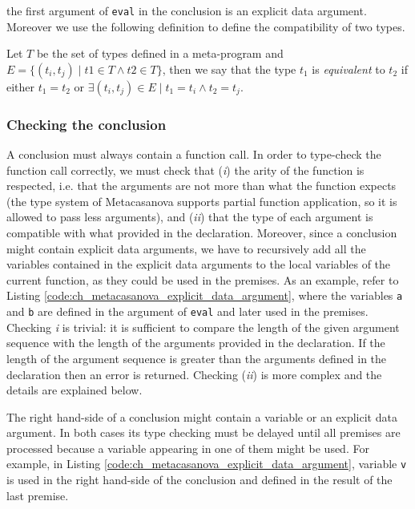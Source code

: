 \noindent
the first argument of \texttt{eval} in the conclusion is an explicit data argument. Moreover we use the following definition to define the compatibility of two types.

\begin{definition}
\label{def:ch_metacasanova_type_equivalence}
	Let $T$ be the set of types defined in a meta-program and $E = \lbrace (t_i,t_j) \; | \; t1 \in T \wedge t2 \in T \rbrace$, then we say that the type $t_1$ is \textit{equivalent} to $t_2$ if either $t_1 = t_2$ or $\exists (t_i,t_j) \in E \; | \; t_1 = t_i \wedge t_2 = t_j$.
\end{definition}

\subsubsection{Checking the conclusion}
A conclusion must always contain a function call. In order to type-check the function call correctly, we must check that (\textit{i}) the arity of the function is respected, i.e. that the arguments are not more than what the function expects (the type system of Metacasanova supports partial function application, so it is allowed to pass less arguments), and (\textit{ii}) that the type of each argument is compatible with what provided in the declaration. Moreover, since a conclusion might contain explicit data arguments, we have to recursively add all the variables contained in the explicit data arguments to the local variables of the current function, as they could be used in the premises. As an example, refer to Listing \ref{code:ch_metacasanova_explicit_data_argument}, where the variables \texttt{a} and \texttt{b} are defined in the argument of \texttt{eval} and later used in the premises.
Checking \textit{i} is trivial: it is sufficient to compare the length of the given argument sequence with the length of the arguments provided in the declaration. If the length of the argument sequence is greater than the arguments defined in the declaration then an error is returned. Checking (\textit{ii}) is more complex and the details are explained below.

The right hand-side of a conclusion might contain a variable or an explicit data argument. In both cases its type checking must be delayed until all premises are processed because a variable appearing in one of them might be used. For example, in Listing \ref{code:ch_metacasanova_explicit_data_argument}, variable \texttt{v} is used in the right hand-side of the conclusion and defined in the result of the last premise.

